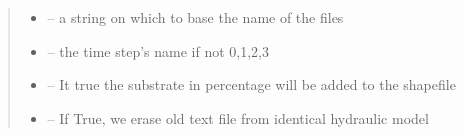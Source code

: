 \documentclass[letterpaper,10pt,english]{sphinxmanual}
\begin{document}
\begin{fulllineitems}
\begin{quote}
\begin{description}
\begin{itemize}
\item {} 
 -- a string on which to base the name of the files

\item {} 
 -- the time step's name if not 0,1,2,3

\item {} 
 -- It true the substrate in percentage will be added to the shapefile

\item {} 
 -- If True, we erase old text file from identical hydraulic model

\end{itemize}

\end{description}\end{quote}

\end{fulllineitems}

\end{document}
